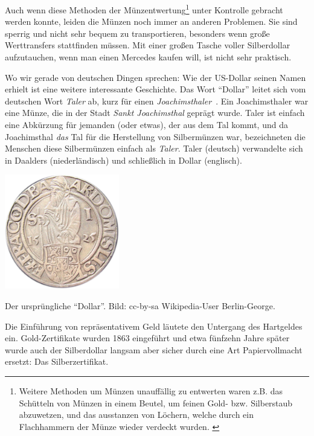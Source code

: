 Auch wenn diese Methoden der Münzentwertung\footnote{ Weitere Methoden um Münzen
unauffällig zu entwerten waren z.B. das Schütteln von Münzen in einem Beutel, um
feinen Gold- bzw. Silberstaub abzuwetzen, und das ausstanzen von Löchern, welche
durch ein Flachhammern der Münze wieder verdeckt wurden.
\cite{wiki:coin-debasement} } unter Kontrolle gebracht werden konnte, leiden die
Münzen noch immer an anderen Problemen. Sie sind sperrig und nicht sehr bequem
zu transportieren, besonders wenn große Werttransfers stattfinden müssen. Mit
einer großen Tasche voller Silberdollar aufzutauchen, wenn man einen Mercedes
kaufen will, ist nicht sehr praktisch.

Wo wir gerade von deutschen Dingen sprechen: Wie der US-Dollar seinen Namen
erhielt ist eine weitere interessante Geschichte. Das Wort \enquote{Dollar}
leitet sich vom deutschen Wort \textit{Taler} ab, kurz für einen
\textit{Joachimsthaler}~\cite{wiki:thaler}. Ein Joachimsthaler war eine Münze,
die in der Stadt \textit{Sankt Joachimsthal} geprägt wurde. Taler ist einfach
eine Abkürzung für jemanden (oder etwas), der aus dem Tal kommt, und da
Joachimsthal \textit{das} Tal für die Herstellung von Silbermünzen war,
bezeichneten die Menschen diese Silbermünzen einfach als \textit{Taler}. Taler (deutsch)
verwandelte sich in Daalders (niederländisch) und schließlich in Dollar
(englisch).

\begin{center}
  \centering
  \includegraphics[width=5cm]{assets/images/joachimsthaler.png}
  \caption{Der ursprüngliche \enquote{Dollar}. Bild: cc-by-sa Wikipedia-User Berlin-George.}
  \label{fig:joachimsthaler}
\end{center}

Die Einführung von repräsentativem Geld läutete den Untergang des Hartgeldes
ein. Gold-Zertifikate wurden 1863 eingeführt und etwa fünfzehn Jahre später
wurde auch der Silberdollar langsam aber sicher durch eine Art Papiervollmacht
ersetzt: Das Silberzertifikat. \cite{wiki:silver-certificate}

